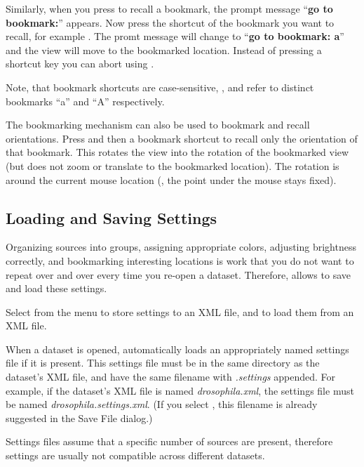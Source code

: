 \documentclass{scrartcl}
\begin{document}
Similarly, when you press  to recall a bookmark, the prompt message ``\textbf{go to bookmark:}'' appears.
Now press the shortcut of the bookmark you want to recall, for example .
The promt message will change to ``\textbf{go to bookmark: a}'' and the view will move to the bookmarked location.
Instead of pressing a shortcut key you can abort using .

Note, that bookmark shortcuts are case-sensitive, \ie,  and  refer to distinct bookmarks ``a'' and ``A'' respectively.

The bookmarking mechanism can also be used to bookmark and recall orientations.
Press  and then a bookmark shortcut to recall only the orientation of that bookmark.
This rotates the view into the rotation of the bookmarked view (but does not zoom or translate to the bookmarked location).
The rotation is around the current mouse location (\ie, the point under the mouse stays fixed).


%
\subsection{Loading and Saving Settings}
Organizing sources into groups, assigning appropriate colors, adjusting brightness correctly, and bookmarking interesting locations is work that you do not want to repeat over and over every time you re-open a dataset.
Therefore, \Bdv allows to save and load these settings.

Select  from the menu to store settings to an XML file, and  to load them from an XML file.

When a dataset is opened, \bdv automatically loads an appropriately named settings file if it is present.
This settings file must be in the same directory as the dataset's XML file, and have the same filename with \emph{.settings} appended.
For example, if the dataset's XML file is named \emph{drosophila.xml}, the settings file must be named \emph{drosophila.settings.xml}.
(If you select , this filename is already suggested in the Save File dialog.)

Settings files assume that a specific number of sources are present, therefore settings are usually not compatible across different datasets.

%
\end{document}
